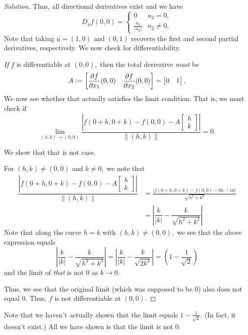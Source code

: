 \documentclass[12pt]{article}
\newcommand{\md}[1]{\left\lvert #1 \right\lvert}
\theoremstyle{definition}
\newenvironment{soln}{\begin{proof}[Solution]}{\end{proof}}
\begin{document}
\begin{itemize}
\begin{soln}
		Thus, all directional derivatives exist and we have
		\begin{equation*} 
			D_{\underline{u}}f(0, 0) = \begin{cases}
				0 & u_2 = 0,\\
				\frac{u_2}{|u_2|} & u_2 \neq 0,
			\end{cases}
		\end{equation*}
		Note that taking $\underline{u} = (1, 0)$ and $(0, 1)$ recovers the first and second partial derivatives, respectively. We now check for differentiability.

		\emph{If} $f$ is differentiable at $(0, 0),$ then the total derivative \emph{must} be 
		\begin{equation*} 
			A \vcentcolon= \begin{bmatrix}
				\dfrac{\partial f}{\partial x_1}(0, 0) &\dfrac{\partial f}{\partial x_2}(0, 0) 
			\end{bmatrix} = \begin{bmatrix}
				0 & 1
			\end{bmatrix}.
		\end{equation*}
		We now see whether that actually satisfies the limit condition. That is, we must check if
		\begin{equation*} 
			\lim_{(h, k)\to (0, 0)} \dfrac{\left|f(0 + h, 0 + k) - f(0, 0) - A\begin{bmatrix}
							h\\
							k
						\end{bmatrix}\right|}{\|(h, k)\|} = 0.
		\end{equation*} 

		We show that that is not case.

		For $(h, k) \neq (0, 0)$ and $k \neq 0,$ we note that
		\begin{align*} 
			\dfrac{\left|f(0 + h, 0 + k) - f(0, 0) - A\begin{bmatrix}
							h\\
							k
						\end{bmatrix}\right|}{\|(h, k)\|} &= \frac{\md{f\left(0+h, 0+k\right)-f\left(0, 0\right)-0 h- 1k}}{\sqrt{h^{2}+k^{2}}}\\
						&= \md{\dfrac{k}{|k|} - \dfrac{k}{\sqrt{h^2 + k^2}}}
		\end{align*}
		Note that along the curve $h = k$ with $(h, k) \neq (0, 0),$ we see that the above expression equals
		\begin{equation*} 
			\md{\dfrac{k}{|k|} - \dfrac{k}{\sqrt{h^2 + k^2}}} = \md{\dfrac{k}{|k|} - \dfrac{k}{\sqrt{2k^2}}} = \left(1 - \dfrac{1}{\sqrt{2}}\right)
		\end{equation*}
		and the limit of \emph{that} is not $0$ as $k \to 0.$

		Thus, we see that the original limit (which was supposed to be $0$) also does not equal $0.$ Thus, $f$ is not differentiable at $(0, 0).$
	\end{soln}
	Note that we haven't actually shown that the limit equals $1 - \frac{1}{\sqrt{2}}.$ (In fact, it doesn't exist.) All we have shown is that the limit is not $0.$
\end{itemize}
%
%
%
\end{document}
